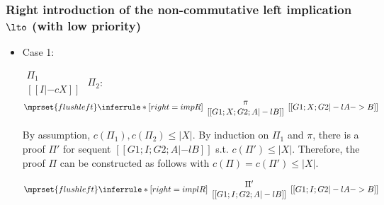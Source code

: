 \subsubsection{Right introduction of the non-commutative left implication $\lto$ (with low priority)}
\begin{itemize}
\item Case 1:
      \begin{center}
        \scriptsize
        \begin{math}
          \begin{array}{c}
            \Pi_1 \\
            {[[I |-c X]]}
          \end{array}
        \end{math}
        \qquad\qquad
        $\Pi_2$:
        \begin{math}
          $$\mprset{flushleft}
          \inferrule* [right={\tiny impR}] {
            {
              \begin{array}{c}
                \pi \\
                {[[G1; X; G2; A |-l B]]}
              \end{array}
            }
          }{[[G1; X; G2 |-l A -> B]]}
        \end{math}
      \end{center}
      By assumption, $c(\Pi_1),c(\Pi_2)\leq |X|$. By induction on $\Pi_1$
      and $\pi$, there is a proof $\Pi'$ for sequent
      $[[G1; I; G2; A |-l B]]$ s.t. $c(\Pi') \leq |X|$. Therefore, the
      proof $\Pi$ can be constructed as follows with
      $c(\Pi) = c(\Pi') \leq |X|$.
      \begin{center}
        \scriptsize
        \begin{math}
          $$\mprset{flushleft}
          \inferrule* [right={\tiny implR}] {
            {
              \begin{array}{c}
                \Pi' \\
                {[[G1; I; G2; A |-l B]]}
              \end{array}
            }
          }{[[G1; I; G2 |-l A -> B]]}
        \end{math}
      \end{center}


\end{itemize}
